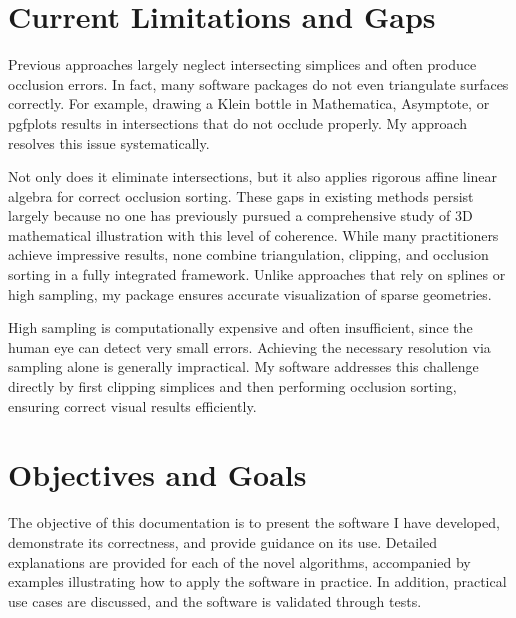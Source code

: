 \section{Current Limitations and Gaps}

Previous approaches largely neglect intersecting simplices and
often produce occlusion errors. In fact, many software packages
do not even triangulate surfaces correctly. For example, drawing
a Klein bottle in Mathematica, Asymptote, or pgfplots results in
intersections that do not occlude properly. My approach resolves
this issue systematically.

Not only does it eliminate intersections, but it also applies
rigorous affine linear algebra for correct occlusion sorting.
These gaps in existing methods persist largely because no one
has previously pursued a comprehensive study of 3D mathematical
illustration with this level of coherence. While many practitioners
achieve impressive results, none combine triangulation, clipping,
and occlusion sorting in a fully integrated framework. Unlike
approaches that rely on splines or high sampling, my package
ensures accurate visualization of sparse geometries.

High sampling is computationally expensive and often insufficient,
since the human eye can detect very small errors. Achieving
the necessary resolution via sampling alone is generally
impractical. My software addresses this challenge directly by
first clipping simplices and then performing occlusion sorting,
ensuring correct visual results efficiently.

\section{Objectives and Goals}

The objective of this documentation is to present the software I
have developed, demonstrate its correctness, and provide guidance
on its use. Detailed explanations are provided for each of the
novel algorithms, accompanied by examples illustrating how to
apply the software in practice. In addition, practical use cases
are discussed, and the software is validated through tests.

